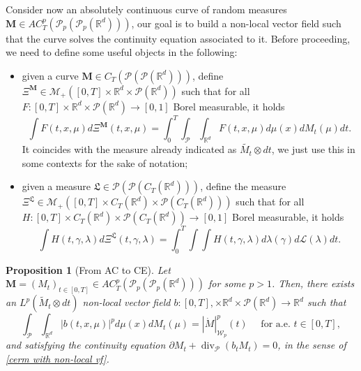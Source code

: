 \documentclass[10pt,leqno]{amsart}
\numberwithin{equation}{section}
\newtheorem{prop}[teorema]{Proposition}
\renewcommand{\L}{\mathcal{L}}
\newcommand{\R}{\mathbb{R}}
\newcommand{\PP}{\mathcal{P}}
\begin{document}
Consider now an absolutely continuous curve of random measures $\boldsymbol{M} \in AC_T^p(\PP_p(\PP_p(\R^d)))$, our goal is to build a non-local vector field such that the curve solves the continuity equation associated to it. Before proceeding, we need to define some useful objects in the following:
\begin{itemize}
    \item given a curve $\boldsymbol{M}\in C_T(\PP(\PP(\R^d)))$, define $\Xi^{\boldsymbol{M}} \in \mathcal{M}_+([0,T]\times \R^d \times \PP(\R^d))$ such that for all $F:[0,T] \times \R^d \times \PP(\R^d) \to [0,1]$ Borel measurable, it holds
    \begin{equation}\label{def of Xi^M}
        \int F(t,x,\mu) d\Xi^{\boldsymbol{M}}(t,x,\mu) = \int_0^T \int_{\PP} \int_{\R^d} F(t,x,\mu) d\mu(x) dM_t(\mu) dt.
    \end{equation}
    It coincides with the measure already indicated as $\widetilde{M_t}\otimes dt$, we just use this in some contexts for the sake of notation;
    \item given a measure $\mathfrak{L}\in \PP(\PP(C_T(\R^d))) $, define the measure $\Xi^{\mathfrak{L}} \in \mathcal{M}_+([0,T]\times C_T(\R^d) \times \PP(C_T(\R^d)))$ such that for all $H:[0,T]\times C_T(\R^d) \times \PP(C_T(\R^d)) \to [0,1]$ Borel measurable, it holds
    \begin{equation}\label{def of Xi^L}
        \int H(t,\gamma,\lambda) d\Xi^{\mathfrak{L}}(t,\gamma,\lambda) = \int_0^T \int \int H(t,\gamma,\lambda) d\lambda(\gamma) d\mathfrak{\L}(\lambda) dt.
    \end{equation}
\end{itemize}


\begin{prop}[From AC to CE]\label{correspondence AC to CERM}
    Let $\boldsymbol{M}=(M_t)_{t\in [0,T]} \in AC_T^p(\PP_p(\PP_p(\R^d)))$ for some $p>1$. Then, there exists an $L^p(\widetilde{M}_t\otimes dt)$ non-local vector field $b:[0,T],\times \R^d \times \PP(\R^d) \to \R^d$ such that
    \begin{equation}\label{eq: energy equality non-local vf}
        \int_\PP\int_{\R^d} |b(t,x,\mu)|^pd\mu(x) dM_t(\mu) = |\dot{M}|^p_{\mathcal{W}_p}(t) \quad \text{ for a.e. }t\in [0,T],
    \end{equation}
    and satisfying the continuity equation $\partial M_t + \operatorname{div}_\PP(b_tM_t) = 0$, in the sense of \eqref{cerm with non-local vf}. 
\end{prop}
\end{document}
